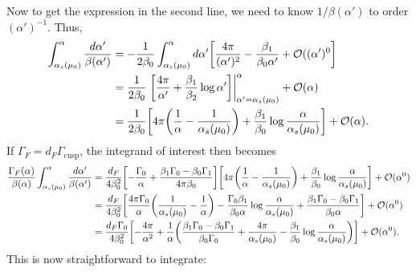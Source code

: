\documentclass[11pt,twoside,reqno]{amsart}
\theoremstyle{plain}
\theoremstyle{remark}
\theoremstyle{definition}
\theoremstyle{remark}
\theoremstyle{definition}
\theoremstyle{definition}
\newcommand{\cO}{\mathcal{O}}
\newcommand{\cusp}{\mathrm{cusp}}
\begin{document}
	Now to get the expression in the second line, we need to know $1/\beta(\alpha')$ to order $(\alpha')^{-1}$. Thus,
	\begin{equation}
	\begin{aligned}
		\int_{\alpha_s(\mu_0)}^\alpha \frac{d\alpha'}{\beta(\alpha')} &= -\frac{1}{2\beta_0}\int_{\alpha_s(\mu_0)}^\alpha d\alpha' \qty[\frac{4\pi}{(\alpha')^2} - \frac{\beta_1}{\beta_0 \alpha'} + \cO((\alpha')^0] \\
		&= \frac{1}{2\beta_0}\eval{\qty[\frac{4\pi}{\alpha'} + \frac{\beta_1}{\beta_2}\log\alpha']}_{\alpha' = \alpha_s(\mu_0)}^\alpha + \cO(\alpha) \\
		&= \frac{1}{2\beta_0}\qty[4\pi\qty(\frac{1}{\alpha} - \frac{1}{\alpha_s(\mu_0)}) + \frac{\beta_1}{\beta_0}\log\frac{\alpha}{\alpha_s(\mu_0)}] + \cO(\alpha).
	\end{aligned}
	\end{equation}
	If $\Gamma_F = d_F \Gamma_\cusp$, the integrand of interest then becomes
	\begin{equation}
	\begin{aligned}
		\frac{\Gamma_F(\alpha)}{\beta(\alpha)}\int_{\alpha_s(\mu_0)}^\alpha \frac{d\alpha'}{\beta(\alpha')} &= \frac{d_F}{4\beta_0^2}\qty[-\frac{\Gamma_0}{\alpha} + \frac{\beta_1 \Gamma_0 - \beta_0 \Gamma_1}{4\pi\beta_0}]\qty[4\pi\qty(\frac{1}{\alpha} - \frac{1}{\alpha_s(\mu_0)}) + \frac{\beta_1}{\beta_0}\log\frac{\alpha}{\alpha_s(\mu_0)}] + \cO(\alpha^0) \\
		&= \frac{d_F}{4\beta_0^2}\qty[\frac{4\pi \Gamma_0}{\alpha}\qty(\frac{1}{\alpha_s(\mu_0)} - \frac{1}{\alpha}) - \frac{\Gamma_0 \beta_1}{\beta_0 \alpha}\log\frac{\alpha}{\alpha_s(\mu_0)} + \frac{\beta_1 \Gamma_0 - \beta_0 \Gamma_1}{\beta_0 \alpha}] + \cO(\alpha^0) \\
		&= \frac{d_F\Gamma_0}{4\beta_0^2}\qty[-\frac{4\pi}{\alpha^2} + \frac{1}{\alpha}\qty(\frac{\beta_1\Gamma_0 - \beta_0 \Gamma_1}{\beta_0\Gamma_0} + \frac{4\pi}{\alpha_s(\mu_0)} - \frac{\beta_1}{\beta_0}\log\frac{\alpha}{\alpha_s(\mu_0)})] + \cO(\alpha^0).
	\end{aligned}
	\end{equation}
	This is now straightforward to integrate:
\end{document}
